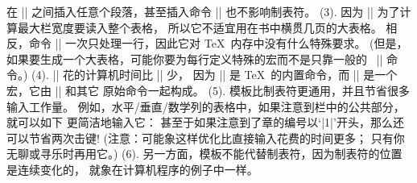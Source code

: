 在 |\+| 之间插入任意个段落，甚至插入命令 |\halign| 也不影响制表符。%
(3). 因为 |\halign| 为了计算最大栏宽度要读入整个表格，
所以它不适宜用在书中横贯几页的大表格。%
相反，命令 |\+| 一次只处理一行，因此它对 \TeX\ 内存中没有什么特殊要求。%
(但是，如果要生成一个大表格，可能你要为每行定义特殊的宏而不是只靠一般的%
~|\+| 命令。)
(4). \1|\halign| 花的计算机时间比 |\+| 少，
因为 |\halign| 是 \TeX\ 的内置命令，而 |\+| 是一个宏，它由 |\halign| 和其它%
原始命令一起构成。%
(5). 模板比制表符更通用，并且节省很多输入工作量。%
例如，水平/垂直/数学列的表格中，如果注意到栏中的公共部分，就可以如下%
更简洁地输入它：
\begintt
{}
\endtt
甚至于如果注意到了章的编号以`|1|'开头，那么还可以节省两次击键!
(注意：可能象这样优化比直接输入花费的时间更多；
只有你无聊或寻乐时再用它。)
(6). 另一方面，模板不能代替制表符，因为制表符的位置是连续变化的，
就象在计算机程序的例子中一样。

